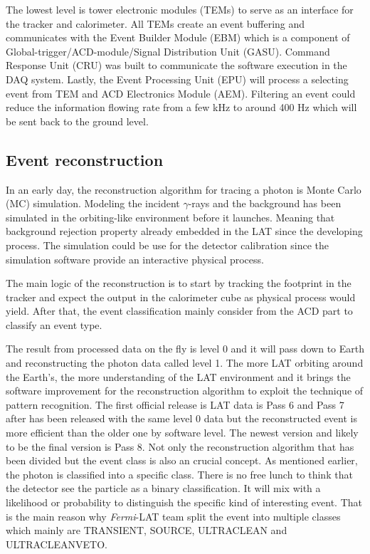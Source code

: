 The lowest level is tower electronic modules (TEMs) to serve as an interface for the tracker and calorimeter. All TEMs create an event 
buffering and communicates with the Event Builder Module (EBM) which is a
component of Global-trigger/ACD-module/Signal Distribution Unit (GASU).
Command Response Unit (CRU) was built to communicate the
software execution in the DAQ system. Lastly, the Event Processing Unit (EPU)
will process a selecting event from TEM and ACD Electronics Module (AEM).
Filtering an event could reduce the information flowing rate from 
a few kHz to around 400 Hz which will be sent back to the ground level.


\subsection{Event reconstruction}

In an early day, the reconstruction algorithm for tracing a photon 
is Monte Carlo (MC) simulation. Modeling the incident $\gamma$-rays 
and the background has been simulated in the orbiting-like environment 
before it launches. Meaning that background rejection property already 
embedded in the LAT since the developing process. The simulation 
could be use for the detector calibration since the simulation software 
provide an interactive physical process.

The main logic of the reconstruction is to start by tracking the footprint 
in the tracker and expect the output in the calorimeter cube as physical process 
would yield. After that, the event classification mainly consider from 
the ACD part to classify an event type.

The result from processed data on the fly is level 0 and it will pass 
down to Earth and reconstructing the photon data called level 1.
The more LAT orbiting around the Earth's, the more understanding of the 
LAT environment and it brings the software improvement for the reconstruction
algorithm to exploit the technique of pattern recognition.
The first official release is LAT data is Pass 6 and Pass 7 after has been 
released with the same level 0 data but the reconstructed event is 
more efficient than the older one by software level. The newest version 
and likely to be the final version is Pass 8. Not only the reconstruction
algorithm that has been divided but the event class is also an 
crucial concept. As mentioned earlier, the photon is classified into 
a specific class. There is no free lunch to think that the detector see 
the particle as a binary classification. It will mix with a likelihood or probability to distinguish the specific kind of interesting event.
That is the main reason why \textit{Fermi}-LAT team split the event 
into multiple classes which mainly are TRANSIENT, SOURCE, ULTRACLEAN and 
ULTRACLEANVETO.

